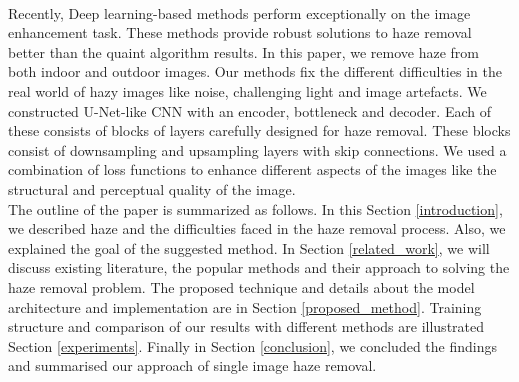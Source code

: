 \\
Recently, Deep learning-based methods perform exceptionally on the image enhancement task. These methods provide robust solutions to haze removal better than the quaint algorithm results. In this paper, we remove haze from both indoor and outdoor images. Our methods fix the different difficulties in the real world of hazy images like noise, challenging light and image artefacts. We constructed U-Net-like CNN \cite{u_net} with an encoder, bottleneck and decoder. Each of these consists of blocks of layers carefully designed for haze removal. These blocks consist of downsampling and upsampling layers with skip connections. We used a combination of loss functions to enhance different aspects of the images like the structural and perceptual quality of the image.
\\
The outline of the paper is summarized as follows. In this Section \ref{introduction}, we described haze and the difficulties faced in the haze removal process. Also, we explained the goal of the suggested method. In Section \ref{related_work}, we will discuss existing literature, the popular methods and their approach to solving the haze removal problem. The proposed technique and details about the model architecture and implementation are in Section \ref{proposed_method}. Training structure and comparison of our results with different methods are illustrated Section \ref{experiments}. Finally in Section \ref{conclusion}, we concluded the findings and summarised our approach of single image haze removal.